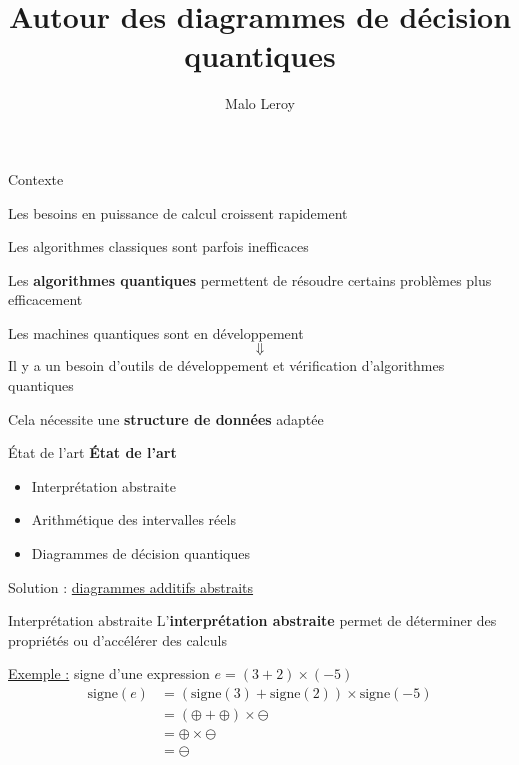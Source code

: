 \documentclass[french, 12pt]{beamer}
\title{Autour des diagrammes de décision quantiques}
\author{Malo Leroy}
\institute{Parcours recherche -- CentraleSupélec}
\begin{document}
\begin{frame}
    \titlepage
\end{frame}

\begin{frame}{Contexte}

\begin{center}
Les besoins en puissance de calcul croissent rapidement


Les algorithmes classiques sont parfois inefficaces

\pause
Les \textbf{algorithmes quantiques} permettent de résoudre certains problèmes plus efficacement
\end{center}
\end{frame}

\begin{frame}
Les machines quantiques sont en développement
$$\Downarrow$$
Il y a un besoin d'outils de développement et vérification d'algorithmes quantiques
\pause

\vspace{1em}
Cela nécessite une \textbf{structure de données} adaptée
\end{frame}

\begin{frame}{État de l'art}
\textbf{État de l'art}
\begin{itemize}
    \item Interprétation abstraite
    \item Arithmétique des intervalles réels
    \item Diagrammes de décision quantiques
\end{itemize}
\pause
\begin{center}
    Solution : \underline{diagrammes additifs abstraits}
\end{center}
\end{frame}

\begin{frame}{Interprétation abstraite}
    L'\textbf{interprétation abstraite} permet de déterminer des propriétés ou d'accélérer des calculs

    \vspace{1em}
    \underline{Exemple :} signe d'une expression $e = (3 + 2) \times (-5)$
    \begin{align*}
        \text{signe}(e) &= (\text{signe}(3) + \text{signe}(2)) \times \text{signe}(-5) \\
        &= (\oplus + \oplus) \times \ominus \\
        &= \oplus \times \ominus \\
        &= \ominus
    \end{align*}
\end{frame}
\end{document}
